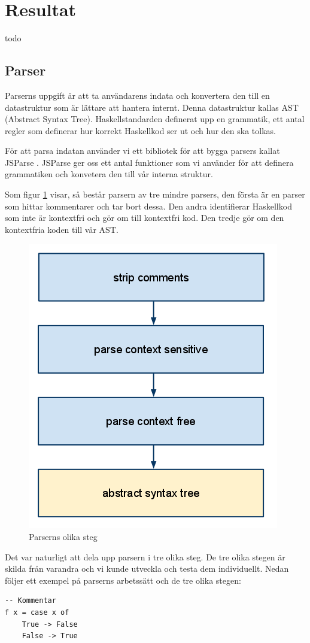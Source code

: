 \section{Resultat}
todo

\subsection{Parser} 
Parserns uppgift är att ta användarens indata och konvertera den till en datastruktur 
som är lättare att hantera internt. Denna datastruktur kallas AST (Abstract Syntax Tree). 
Haskellstandarden definerat upp en grammatik, ett antal regler som definerar hur korrekt Haskellkod ser ut och hur den ska tolkas.

För att parsa indatan använder vi ett bibliotek för att bygga parsers kallat JSParse \citep{jsparse}.
JSParse ger oss ett antal funktioner som vi använder för att definera grammatiken och konvetera den till vår interna struktur.

Som figur \ref{fig:parser_steg} visar, så består parsern av tre mindre parsers, den första är en parser som hittar kommentarer och tar bort dessa. 
Den andra identifierar Haskellkod som inte är kontextfri och gör om till kontextfri kod. Den tredje gör om den kontextfria koden till vår AST.

\begin{figure}[H]
    \begin{center}
        \includegraphics[width=.5\textwidth]{parser_1.png}
        \caption{Parserns olika steg}
        \label{fig:parser_steg} %
    \end{center}
\end{figure}

Det var naturligt att dela upp parsern i tre olika steg. De tre olika stegen är skilda från varandra och vi kunde utveckla och testa dem individuellt.
Nedan följer ett exempel på parserns arbetssätt och de tre olika stegen:
\begin{lstlisting}
-- Kommentar
f x = case x of
    True -> False
    False -> True
\end{lstlisting}

